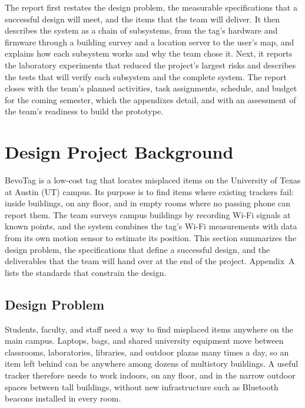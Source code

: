\documentclass[12pt,letterpaper]{article}
\begin{document}
The report first restates the design problem, the measurable specifications that a successful
design will meet, and the items that the team will deliver. It then describes the system as a chain
of subsystems, from the tag's hardware and firmware through a building survey and a location server
to the user's map, and explains how each subsystem works and why the team chose it. Next, it reports
the laboratory experiments that reduced the project's largest risks and describes the tests that
will verify each subsystem and the complete system. The report closes with the team's planned
activities, task assignments, schedule, and budget for the coming semester, which the appendixes
detail, and with an assessment of the team's readiness to build the prototype.

\section{Design Project Background}\label{sec:background}
BevoTag is a low-cost tag that locates misplaced items on the University of Texas at Austin (UT)
campus. Its purpose is to find items where existing trackers fail: inside buildings, on any floor,
and in empty rooms where no passing phone can report them. The team surveys campus buildings by
recording Wi-Fi signals at known points, and the system combines the tag's Wi-Fi measurements with
data from its own motion sensor to estimate its position. This section summarizes the design problem,
the specifications that define a successful design, and the deliverables that the team will hand over
at the end of the project. Appendix~A lists the standards that constrain the design.

\subsection{Design Problem}
Students, faculty, and staff need a way to find misplaced items anywhere on the main campus. Laptops,
bags, and shared university equipment move between classrooms, laboratories, libraries, and outdoor
plazas many times a day, so an item left behind can be anywhere among dozens of multistory buildings.
A useful tracker therefore needs to work indoors, on any floor, and in the narrow outdoor spaces
between tall buildings, without new infrastructure such as Bluetooth beacons installed in every room.
\end{document}
